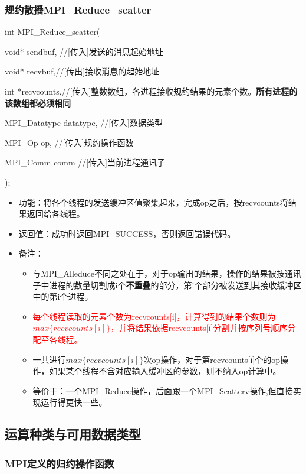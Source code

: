 \documentclass[UTF8]{article}%
\begin{document}
\subsubsection{规约散播MPI\_Reduce\_scatter}

int MPI\_Reduce\_scatter(
    
    \qquad void* sendbuf, //[传入]发送的消息起始地址

    \qquad void* recvbuf,//[传出]接收消息的起始地址

    \qquad int *recvcounts,//[传入]整数数组，各进程接收规约结果的元素个数。\textbf{所有进程的该数组都必须相同}

    \qquad MPI\_Datatype datatype, //[传入]数据类型

    \qquad MPI\_Op op, //[传入]规约操作函数

    \qquad MPI\_Comm comm //[传入]当前进程通讯子
    
);

\begin{itemize}
    \item 功能：将各个线程的发送缓冲区值聚集起来，完成op之后，按recvcounts将结果返回给各线程。
    \item 返回值：成功时返回MPI\_SUCCESS，否则返回错误代码。
    \item 备注：
    
    {
        \begin{itemize}
            \item 与MPI\_Alleduce不同之处在于，对于op输出的结果，操作的结果被按通讯子中进程的数量切割成i个\textbf{不重叠}的部分，第i个部分被发送到其接收缓冲区中的第i个进程。
            \item \textcolor{red}{每个线程读取的元素个数为recvcounts[i]，计算得到的结果个数则为$max\{recvcounts[i]\}$，并将结果依据recvcounts[i]分割并按序列号顺序分配至各线程。}
            \item 一共进行$max\{recvcounts[i]\}$次op操作，对于第recvcounts[i]个的op操作，如果某个线程不含对应输入缓冲区的参数，则不纳入op计算中。
            \item 等价于：一个MPI\_Reduce操作，后面跟一个MPI\_Scatterv操作,但直接实现运行得更快一些。
        \end{itemize}
    }
\end{itemize}

\subsection{运算种类与可用数据类型}

\subsubsection{MPI定义的归约操作函数}
\end{document}
